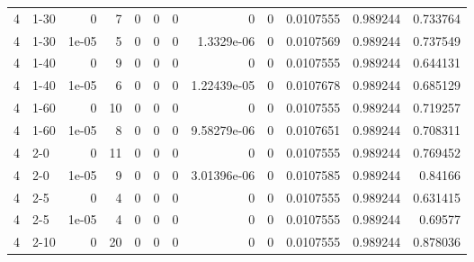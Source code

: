 \begin{tabular}{rlrrrrrrrrrr}
     4 & 1-30   &      0     &           7 &                 0 &                 0 &     0           &     0           &      0           &        0.0107555 &               0.989244 &           0.733764 \\
     4 & 1-30   &      1e-05 &           5 &                 0 &                 0 &     0           &     1.3329e-06  &      0           &        0.0107569 &               0.989244 &           0.737549 \\
     4 & 1-40   &      0     &           9 &                 0 &                 0 &     0           &     0           &      0           &        0.0107555 &               0.989244 &           0.644131 \\
     4 & 1-40   &      1e-05 &           6 &                 0 &                 0 &     0           &     1.22439e-05 &      0           &        0.0107678 &               0.989244 &           0.685129 \\
     4 & 1-60   &      0     &          10 &                 0 &                 0 &     0           &     0           &      0           &        0.0107555 &               0.989244 &           0.719257 \\
     4 & 1-60   &      1e-05 &           8 &                 0 &                 0 &     0           &     9.58279e-06 &      0           &        0.0107651 &               0.989244 &           0.708311 \\
     4 & 2-0    &      0     &          11 &                 0 &                 0 &     0           &     0           &      0           &        0.0107555 &               0.989244 &           0.769452 \\
     4 & 2-0    &      1e-05 &           9 &                 0 &                 0 &     0           &     3.01396e-06 &      0           &        0.0107585 &               0.989244 &           0.84166  \\
     4 & 2-5    &      0     &           4 &                 0 &                 0 &     0           &     0           &      0           &        0.0107555 &               0.989244 &           0.631415 \\
     4 & 2-5    &      1e-05 &           4 &                 0 &                 0 &     0           &     0           &      0           &        0.0107555 &               0.989244 &           0.69577  \\
     4 & 2-10   &      0     &          20 &                 0 &                 0 &     0           &     0           &      0           &        0.0107555 &               0.989244 &           0.878036 \\

\end{tabular}
